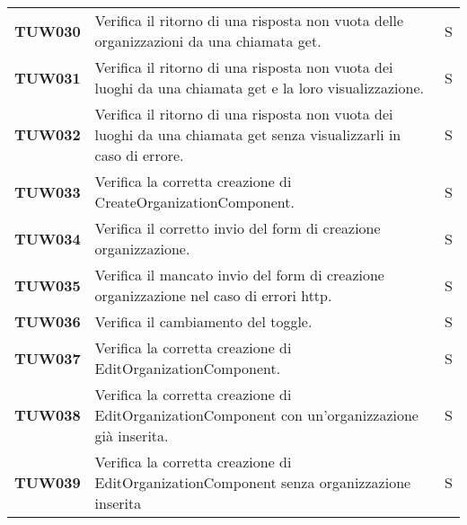 \documentclass[../../piano-di-qualifica.tex]{subfiles}
\begin{document}
\begin{longtable}[H]{>{\centering\bfseries}m{3cm} >{}m{10cm} >{\centering\arraybackslash}m{3cm}}
  TUW030             & Verifica il ritorno di una risposta non vuota delle organizzazioni da una chiamata get.                             & S                             \\

  TUW031             & Verifica il ritorno di una risposta non vuota dei luoghi da una chiamata get e la loro visualizzazione.             & S                             \\

  TUW032             & Verifica il ritorno di una risposta non vuota dei luoghi da una chiamata get senza visualizzarli in caso di errore. & S                             \\


  TUW033             & Verifica la corretta creazione di CreateOrganizationComponent.                                                      & S                             \\

  TUW034             & Verifica il corretto invio del form di creazione organizzazione.                                                    & S                             \\

  TUW035             & Verifica il mancato invio del form di creazione organizzazione nel caso di errori http.                             & S                             \\

  TUW036             & Verifica il cambiamento del toggle.                                                                                 & S                             \\


  TUW037             & Verifica la corretta creazione di EditOrganizationComponent.                                                        & S                             \\

  TUW038             & Verifica la corretta creazione di EditOrganizationComponent con un'organizzazione già inserita.                     & S                             \\

  TUW039             & Verifica la corretta creazione di EditOrganizationComponent senza organizzazione inserita                           & S                             \\


\end{longtable}
\end{document}
